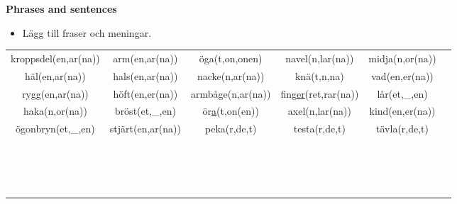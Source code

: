 
\begin{flushleft}
    \textbf{Phrases and sentences}
    \begin{itemize}
        \item Lägg till fraser och meningar.
    \end{itemize}
\end{flushleft}

\begin{center}
    \begin{adjustwidth}{-2.4cm}{}
        \begin{tabular}{|c c c c c c|}
            \hline
            kroppsdel(en,ar(na)) & arm(en,ar(na)) & öga(t,on,onen) & navel(n,lar(na)) & midja(n,or(na)) &  \\
            häl(en,ar(na)) & hals(en,ar(na)) & nacke(n,ar(na)) & knä(t,n,na) & vad(en,er(na)) &  \\
            rygg(en,ar(na)) & höft(en,er(na)) & armbåge(n,ar(na)) & fing\underline{er}(ret,rar(na)) & lår(et,\_,en) &  \\
            haka(n,or(na)) & bröst(et,\_,en) & ör\underline{a}(t,on(en)) & axel(n,lar(na)) & kind(en,er(na)) &  \\
            ögonbryn(et,\_,en) & stjärt(en,ar(na)) & peka(r,de,t) & testa(r,de,t) & tävla(r,de,t) &  \\
             &  &  &  &  &  \\
             &  &  &  &  &  \\
             &  &  &  &  &  \\
             &  &  &  &  &  \\
             &  &  &  &  &  \\
             &  &  &  &  &  \\
             &  &  &  &  &  \\
             &  &  &  &  &  \\
             &  &  &  &  &  \\
             &  &  &  &  &  \\
             &  &  &  &  &  \\
             &  &  &  &  &  \\
             &  &  &  &  &  \\
             &  &  &  &  &  \\
             &  &  &  &  &  \\
             &  &  &  &  &  \\

\end{tabular}
\end{adjustwidth}
\end{center}

